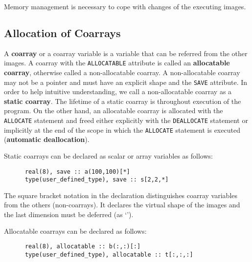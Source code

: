 
\requirement
Memory management is necessary to cope with changes of the executing images.



\subsection{Allocation of Coarrays}

A {\bf coarray} or a coarray variable is a variable that can be referred from the other images. 
A coarray with the {\tt ALLOCATABLE} attribute is called an {\bf allocatable coarray}, 
otherwise called a non-allocatable coarray. A non-allocatable coarray may not be a pointer 
and must have an explicit shape and the {\tt SAVE} attribute. 
In order to help intuitive understanding, we call a non-allocatable coarray as 
a {\bf static coarray}. The lifetime of a static coarray is throughout execution of the program. 
On the other hand, an allocatable coarray is allocated with the {\tt ALLOCATE} statement and 
freed either explicitly with the {\tt DEALLOCATE} statement or implicitly at the end of the scope
in which the {\tt ALLOCATE} statement is executed ({\bf automatic deallocation}).

Static coarrays can be declared as scalar or array variables as follows:
\begin{verbatim}
      real(8), save :: a(100,100)[*]
      type(user_defined_type), save :: s[2,2,*]
\end{verbatim}

The square bracket notation in the declaration distinguishes coarray variables from 
the others (non-coarrays). It declares the virtual shape of the images and the last 
dimension must be deferred (as `{\tt *}').

Allocatable coarrays can be declared as follows:
\begin{verbatim}
      real(8), allocatable :: b(:,:)[:]
      type(user_defined_type), allocatable :: t[:,:,:]
\end{verbatim}


